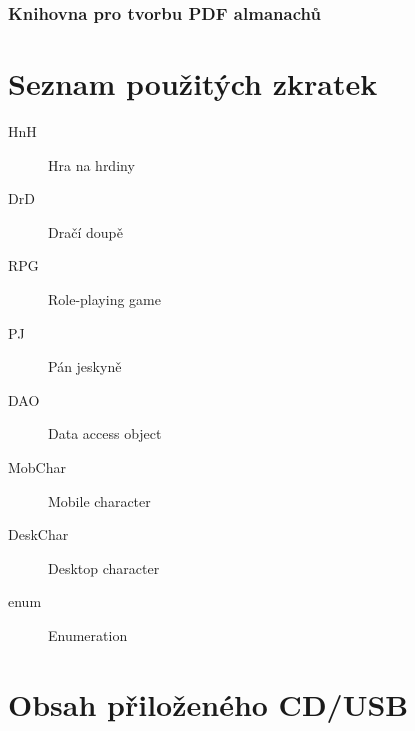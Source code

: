 \documentclass[thesis=B,czech]{resources/FITthesis}[2012/06/26]
\begin{document}
\subsection{Knihovna pro tvorbu PDF almanachů}

\begin{conclusion}
\end{conclusion}




\appendix

\chapter{Seznam použitých zkratek}
\begin{description}
	\item[HnH] Hra na hrdiny
	\item[DrD] Dračí doupě
	\item[RPG] Role-playing game
	\item[PJ] Pán jeskyně
	\item[DAO] Data access object
	\item[MobChar] Mobile character
	\item[DeskChar] Desktop character
	\item[enum] Enumeration
\end{description}

 

\chapter{Obsah přiloženého CD/USB}


\begin{figure}
\end{figure}
\end{document}
